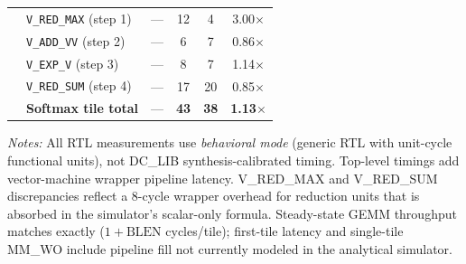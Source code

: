 \begin{table}[t]
\begin{tabular}{@{}llcccc@{}}
  & \texttt{V\_RED\_MAX} (step 1)  & — & 12 & 4  & 3.00$\times$ \\
  & \texttt{V\_ADD\_VV}  (step 2)  & — & 6  & 7  & 0.86$\times$ \\
  & \texttt{V\_EXP\_V}   (step 3)  & — & 8  & 7  & 1.14$\times$ \\
  & \texttt{V\_RED\_SUM} (step 4)  & — & 17 & 20 & 0.85$\times$ \\
  & \textbf{Softmax tile total}    & — & \textbf{43} & \textbf{38} & \textbf{1.13$\times$} \\
\bottomrule
\end{tabular}
\smallskip

\raggedright
\footnotesize
\textit{Notes:}
All RTL measurements use \emph{behavioral mode} (generic RTL with unit-cycle
functional units), not DC\_LIB synthesis-calibrated timing.
Top-level timings add vector-machine wrapper pipeline latency.
V\_RED\_MAX and V\_RED\_SUM discrepancies reflect a 8-cycle wrapper overhead
for reduction units that is absorbed in the simulator's scalar-only formula.
Steady-state GEMM throughput matches exactly ($1+\text{BLEN}$ cycles/tile);
first-tile latency and single-tile MM\_WO include pipeline fill not currently
modeled in the analytical simulator.
\end{table}



